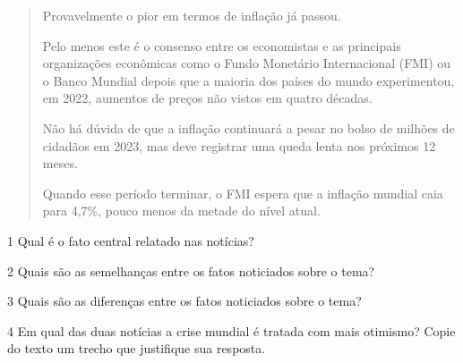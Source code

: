 {\begin{quote}
Provavelmente o pior em termos de inflação já passou.

Pelo menos este é o consenso entre os economistas e as principais
organizações econômicas como o Fundo Monetário Internacional (FMI) ou o
Banco Mundial depois que a maioria dos países do mundo experimentou, em
2022, aumentos de preços não vistos em quatro décadas.

Não há dúvida de que a inflação continuará a pesar no bolso de milhões
de cidadãos em 2023, mas deve registrar uma queda lenta nos próximos 12
meses.

Quando esse período terminar, o FMI espera que a inflação mundial caia
para 4,7\%, pouco menos da metade do nível atual. 

\end{quote}


\num{1} Qual é o fato central relatado nas notícias?


\num{2} Quais são as semelhanças entre os fatos noticiados sobre o tema?


\num{3} Quais são as diferenças entre os fatos noticiados sobre o tema?


\num{4} Em qual das duas notícias a crise mundial é tratada com mais otimismo?
Copie do texto um trecho que justifique sua resposta.

}
